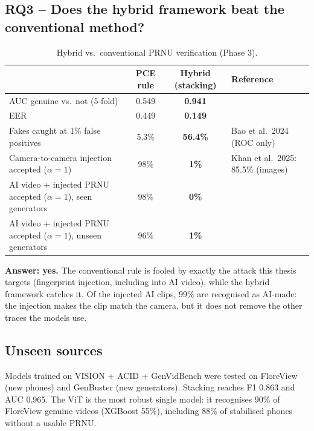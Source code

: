 \documentclass[11pt,a4paper]{article}
\begin{document}
\subsection{RQ3 -- Does the hybrid framework beat the conventional method?}\label{sec:rq3}
\begin{table}[H]\centering\small
\begin{tabularx}{\linewidth}{Ycc>{\raggedright\arraybackslash}p{3.3cm}}\toprule
 & PCE rule & Hybrid (stacking) & Reference \\\midrule
AUC genuine vs.\ not (5-fold) & 0.549 & \textbf{0.941} & \\
EER & 0.449 & \textbf{0.149} & \\
Fakes caught at 1\% false positives & 5.3\% & \textbf{56.4\%} & Bao et al.\ 2024 (ROC only) \\
Camera-to-camera injection accepted ($\alpha=1$) & 98\% & \textbf{1\%} & Khan et al.\ 2025: 85.5\% (images) \\
AI video + injected PRNU accepted ($\alpha=1$), seen generators & 98\% & \textbf{0\%} & \\
AI video + injected PRNU accepted ($\alpha=1$), unseen generators & 96\% & \textbf{1\%} & \\\bottomrule
\end{tabularx}\caption{Hybrid vs.\ conventional PRNU verification (Phase 3).}\end{table}
\textbf{Answer: yes.} The conventional rule is fooled by exactly the attack this thesis targets (fingerprint injection,
including into AI video), while the hybrid framework catches it. Of the injected AI clips, 99\% are recognised as AI-made: the
injection makes the clip match the camera, but it does not remove the other traces the models use.

\subsection{Unseen sources}
Models trained on VISION + ACID + GenVidBench were tested on FloreView (new phones) and GenBuster (new generators). Stacking
reaches F1 0.863 and AUC 0.965. The ViT is the most robust single model: it recognises 90\% of FloreView genuine videos
(XGBoost 55\%), including 88\% of stabilised phones without a usable PRNU.
\end{document}
